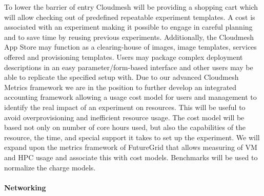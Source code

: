 \documentclass{tex/sig-alternate-2013}
\newcommand{\todo}[1]{{\color{red}{#1}}}
\begin{document}
To lower the barrier of entry Cloudmesh will be providing a shopping cart which will allow checking out of predefined repeatable experiment templates. A cost is associated with an experiment making it possible to engage in careful planning and to save time by reusing previous experiments. Additionally, the Cloudmesh App Store may function as a clearing-house of images, image templates, services offered and provisioning templates. Users may package complex deployment descriptions in an easy parameter/form-based interface and other users may be able to replicate the specified setup with.
Due to our advanced Cloudmesh Metrics framework we are in the position to further develop an integrated accounting framework allowing a usage cost model for users and management to identify the real impact of an experiment on resources. This will be useful to avoid overprovisioning and inefficient resource usage. The cost model will be based not only on number of core hours used, but also the capabilities of the resource, the time, and special support it takes to set up the experiment. We will expand upon the metrics framework of FutureGrid that allows measuring of VM and HPC usage and associate this with cost models. Benchmarks will be used to normalize the charge models.


\paragraph{Networking}
\todo{read}
\end{document}
